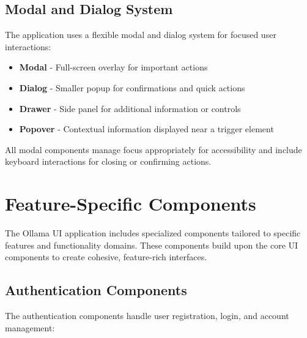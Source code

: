 \subsection{Modal and Dialog System}

The application uses a flexible modal and dialog system for focused user interactions:

\begin{itemize}
  \item \textbf{Modal} - Full-screen overlay for important actions
  \item \textbf{Dialog} - Smaller popup for confirmations and quick actions
  \item \textbf{Drawer} - Side panel for additional information or controls
  \item \textbf{Popover} - Contextual information displayed near a trigger element
\end{itemize}

All modal components manage focus appropriately for accessibility and include keyboard interactions for closing or confirming actions.

\section{Feature-Specific Components}

The Ollama UI application includes specialized components tailored to specific features and functionality domains. These components build upon the core UI components to create cohesive, feature-rich interfaces.

\subsection{Authentication Components}

The authentication components handle user registration, login, and account management:

